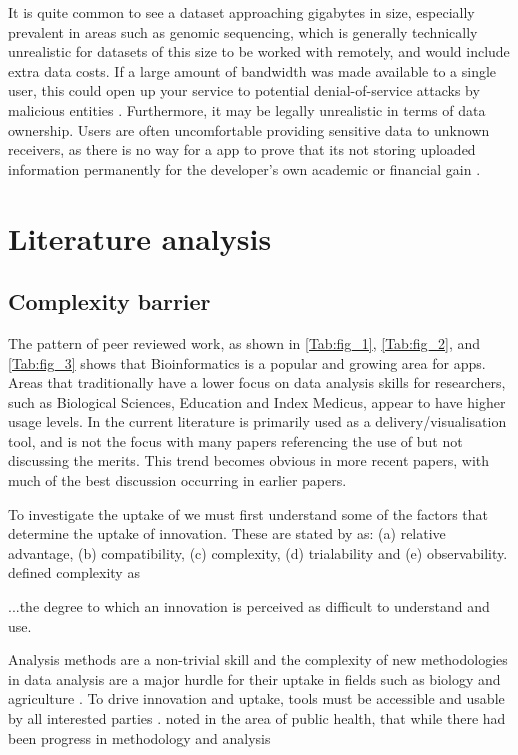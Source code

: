 It is quite common to see a dataset approaching gigabytes in size, especially prevalent in areas such as genomic sequencing, which is generally technically unrealistic for datasets of this size to be worked with remotely, and would include extra data costs.  If a large amount of bandwidth was made available to a single user, this could open up your service to potential denial-of-service attacks by malicious entities \citep{cloudflare_what_2019}.  Furthermore, it may be legally unrealistic in terms of data ownership.  Users are often uncomfortable providing sensitive data to unknown receivers, as there is no way for a  app to prove that its not storing uploaded information permanently for the developer's own academic or financial gain \citep{kacha_overview_2018}.


\section{Literature analysis}

\subsection{Complexity barrier}
The pattern of peer reviewed work, as shown in \autoref{Tab:fig_1}, \autoref{Tab:fig_2}, and \autoref{Tab:fig_3} shows that Bioinformatics is a popular and growing area for  apps.  Areas that traditionally have a lower focus on data analysis skills for researchers, such as Biological Sciences, Education and Index Medicus, appear to have higher usage levels.  In the current literature  is primarily used as a delivery/visualisation tool, and is not the focus with many papers referencing the use of  but not discussing the merits.   This trend becomes obvious in more recent papers, with much of the best discussion occurring in earlier papers.

To investigate the uptake of  we must first understand some of the factors that determine the uptake of innovation.  These are stated by \citet{rogers_evolution_2001} as: (a) relative advantage, (b) compatibility, (c) complexity, (d) trialability and (e) observability.  \citet{rogers_evolution_2001} defined complexity as

\begin{displayquote}
	...the degree to which an innovation is perceived as difficult to understand and use.
\end{displayquote}

Analysis methods are a non-trivial skill and the complexity of new methodologies in data analysis are a major hurdle for their uptake in fields such as biology and agriculture \citep{depalma_determination_2017}.  To drive innovation and uptake, tools must be accessible and usable by all interested parties \citep{jahanshiri_developing_2014,klein_webxtreme_2017}.  \citet{moraga_spatialepiapp_2017} noted in the area of public health, that while there had been progress in methodology and analysis

